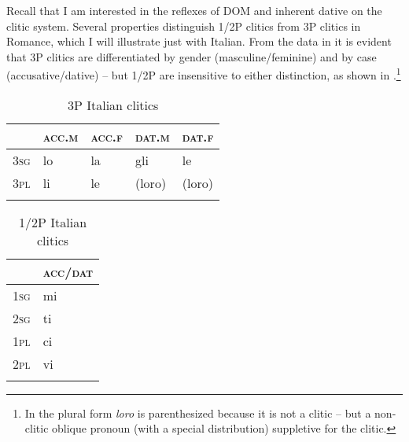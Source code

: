 \documentclass[output=paper,colorlinks,citecolor=brown,modfonts,nonflat]{langsci/langscibook}
\begin{document}
Recall that I am interested in the reflexes of DOM and inherent dative on the clitic system. {Several properties distinguish 1/2P clitics from 3P clitics in Romance, which I will illustrate just with Italian. From the data in  it is evident that 3P clitics are differentiated by gender (masculine/feminine) and by case (accusative/dative) – but 1/2P are insensitive to either distinction, as shown in .}\footnote{In  the plural form \emph{loro} is parenthesized because it is not a clitic -- but a non-clitic oblique pronoun (with a special distribution) suppletive for the clitic.}


\begin{table}
\caption{3P Italian clitics}\label{extab:manzini:11}
\begin{tabular}{lllll}
\lsptoprule
 & \textsc{acc.m} & \textsc{acc.f} & \textsc{dat.m} & \textsc{dat.f}\\
 \midrule
\textsc{3sg} & {lo} & {la} & {gli} & {le}\\
\textsc{3pl} & {li} & {le} &  ({loro}) & ({loro})\\
\lspbottomrule
\end{tabular}
\end{table}



\begin{table}
\caption{1/2P Italian clitics}\label{extab:manzini:12}
\begin{tabular}{ll}
\lsptoprule
& \textsc{acc}/\textsc{dat}\\
\midrule
\textsc{1sg} & {mi} \\
\textsc{2sg} & {ti} \\
\textsc{1pl} & {ci} \\
\textsc{2pl} & {vi} \\
\lspbottomrule
\end{tabular}
\end{table}
\end{document}
